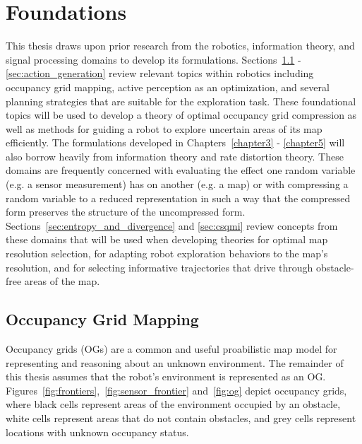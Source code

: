 \chapter{Foundations}
\label{chapter2}

This thesis draws upon prior research from the robotics, information theory, and signal
processing domains to develop its formulations.
Sections~\ref{sec:occ_grid_mapping} - \ref{sec:action_generation} review relevant topics within
robotics including occupancy grid mapping,
active perception as an optimization, and several planning strategies that are suitable for the
exploration task. These foundational topics will be used to develop a theory of
optimal occupancy grid compression as well as methods for guiding a robot to explore
uncertain areas of its map efficiently. The formulations developed in
Chapters~\ref{chapter3} - \ref{chapter5} will also
borrow heavily from information theory and rate distortion theory. These
domains are frequently concerned with evaluating the effect one random
variable (e.g. a sensor measurement) has on
another (e.g. a map) or with compressing a random variable to a reduced
representation in such a way that the compressed form preserves the structure of the
uncompressed form.
Sections~\ref{sec:entropy_and_divergence} and \ref{sec:csqmi} review concepts from
these domains that will be used when developing theories for optimal map resolution selection,
for adapting robot exploration behaviors to the map's resolution, and for
selecting informative trajectories that drive through obstacle-free areas of the map.

\section{Occupancy Grid Mapping}
\label{sec:occ_grid_mapping}

Occupancy grids (OGs) are a common and useful proabilistic map model for representing and
reasoning about an unknown environment. The remainder of this
thesis assumes that the robot's environment is represented as an OG.
Figures~\ref{fig:frontiers},~\ref{fig:sensor_frontier} and~\ref{fig:og} depict occupancy grids,
where black cells represent areas of the environment occupied by an obstacle, white cells
represent areas that do not contain obstacles, and grey cells represent
locations with unknown occupancy status.

